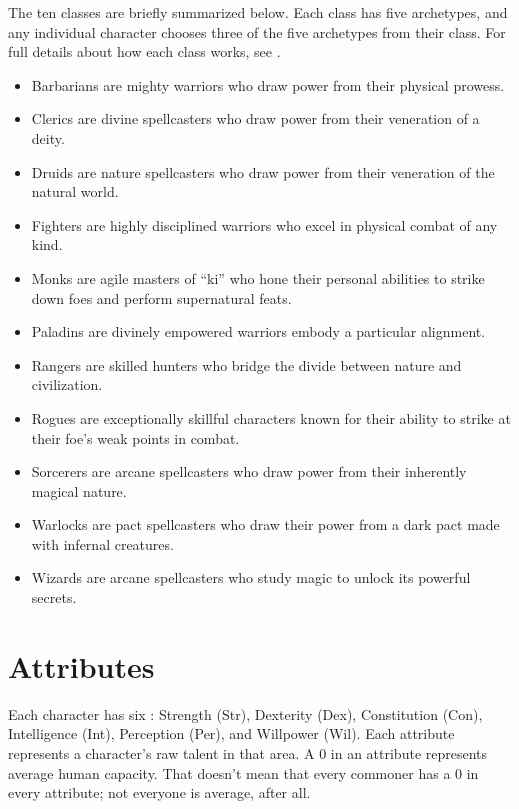     The ten classes are briefly summarized below.
    Each class has five archetypes, and any individual character chooses three of the five archetypes from their class.
    For full details about how each class works, see .
    \begin{itemize}
        \item Barbarians are mighty warriors who draw power from their physical prowess.
        \item Clerics are divine spellcasters who draw power from their veneration of a deity.
        \item Druids are nature spellcasters who draw power from their veneration of the natural world.
        \item Fighters are highly disciplined warriors who excel in physical combat of any kind.
        \item Monks are agile masters of ``ki'' who hone their personal abilities to strike down foes and perform supernatural feats.
        \item Paladins are divinely empowered warriors embody a particular alignment.
        \item Rangers are skilled hunters who bridge the divide between nature and civilization.
        \item Rogues are exceptionally skillful characters known for their ability to strike at their foe's weak points in combat.
        \item Sorcerers are arcane spellcasters who draw power from their inherently magical nature.
        \item Warlocks are pact spellcasters who draw their power from a dark pact made with infernal creatures.
        \item Wizards are arcane spellcasters who study magic to unlock its powerful secrets.
    \end{itemize}

\section{Attributes}\label{Attributes}

    Each character has six : Strength (Str), Dexterity (Dex), Constitution (Con), Intelligence (Int), Perception (Per), and Willpower (Wil).
    Each attribute represents a character's raw talent in that area.
    A 0 in an attribute represents average human capacity.
    That doesn't mean that every commoner has a 0 in every attribute; not everyone is average, after all.

